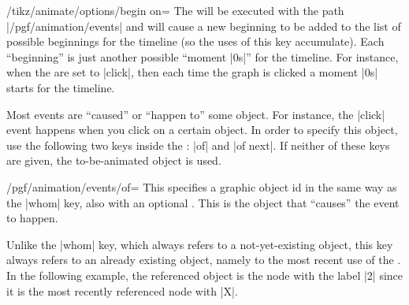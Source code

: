 \begin{key}{/tikz/animate/options/begin on=}
    The  will be executed with the path |/pgf/animation/events|
    and will cause a new beginning to be added to the list of possible
    beginnings for the timeline (so the uses of this key accumulate). Each
    ``beginning'' is just another possible ``moment |0s|'' for the timeline.
    For instance, when the  are set to |click|, then each time
    the graph is clicked a moment |0s| starts for the timeline.

    Most events are ``caused'' or ``happen to'' some object. For instance, the
    |click| event happens when you click on a certain object. In order to
    specify this object, use the following two keys inside the :
    |of| and |of next|. If neither of these keys are given, the to-be-animated
    object is used.

    \begin{key}{/pgf/animation/events/of=}
        This specifies a graphic object id in the same way as the |whom| key,
        also with an optional . This is the object that ``causes''
        the event to happen.

        Unlike the |whom| key, which always refers to a not-yet-existing
        object, this key always refers to an already existing object, namely to
        the most recent use of the . In the following example, the
        referenced object is the node with the label |2| since it is the most
        recently referenced node with  |X|.
\begin{codeexample}[imagesource={standalone/pgfmanual-en-tikz-animations-animation-58.svg}]
\end{codeexample}
    \end{key}


\end{key}
